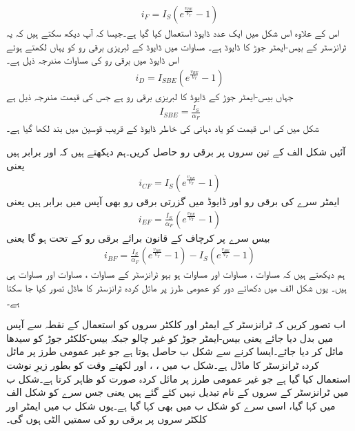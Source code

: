 \begin{align}
i_F = I_S \left (e^{\frac{v_{BE}}{V_T}}-1 \right )
\end{align}
اس کے علاوہ اس شکل میں ایک عدد ڈایوڈ استعمال کیا گیا ہے۔جیسا کہ آپ دیکھ سکتے ہیں کہ یہ ٹرانزسٹر کے بیس-ایمٹر  جوڑ کا ڈایوڈ   ہے۔ مساوات  میں ڈایوڈ کے لبریزی برقی رو کو یہاں لکھتے ہوئے اس ڈایوڈ میں برقی رو کی مساوات مندرجہ ذیل ہے۔
\begin{align}
i_D=I_{SBE} \left (e^{\frac{v_{BE}}{V_T}}-1 \right )
\end{align}
جہاں   بیس-ایمٹر  جوڑ کے ڈایوڈ کا لبریزی برقی رو ہے جس کی قیمت مندرجہ ذیل ہے
\begin{align}
I_{SBE}=\frac{I_S}{\alpha_F}
\end{align}
شکل میں  کی اس قیمت کو یاد دہانی کی خاطر ڈایوڈ کے قریب قوسین میں بند لکھا گیا ہے۔

آئیں شکل  الف کے تین سروں پر برقی رو حاصل کریں۔ہم دیکھتے ہیں کہ  اور  برابر ہیں یعنی
\begin{align} \label{مساوات_ٹرانزسٹر_ہوبہو_کلکٹر _سیدھی_رو}
i_{CF}=I_S \left (e^{\frac{v_{BE}}{V_T}}-1 \right )
\end{align}
ایمٹر سرے کی برقی رو  اور ڈایوڈ    میں گزرتی برقی رو   بھی آپس میں برابر ہیں یعنی
\begin{align} \label{مساوات_ٹرانزسٹر_ہوبہو_مخارج_سیدھی_رو}
i_{EF}=\frac{I_S}{\alpha_F} \left (e^{\frac{v_{BE}}{V_T}}-1 \right )
\end{align}
بیس سرے پر کرچاف کے قانون برائے برقی رو کے تحت   ہو گا یعنی
\begin{align} \label{مساوات_ٹرانزسٹر_ہوبہو_قابو_سیدھی_رو_الف}
i_{BF}=\frac{I_S}{\alpha_F} \left (e^{\frac{v_{BE}}{V_T}}-1 \right )-I_S \left (e^{\frac{v_{BE}}{V_T}}-1 \right )
\end{align}
ہم دیکھتے ہیں کہ مساوات  ، مساوات   اور مساوات   ہو بہو ٹرانزسٹر کے مساوات  ، مساوات   اور مساوات   ہی ہیں۔ یوں شکل  الف میں دکھائے دور کو عمومی طرز پر مائل کردہ ٹرانزسٹر کا ماڈل تصور کیا جا سکتا ہے۔

اب تصور کریں کہ ٹرانزسٹر کے ایمٹر اور کلکٹر  سروں کو استعمال کے نقطہ سے آپس میں بدل دیا جائے یعنی بیس-ایمٹر  جوڑ کو غیر چالو جبکہ بیس-کلکٹر جوڑ کو سیدھا مائل کر دیا جائے۔ایسا کرنے سے شکل  ب حاصل ہوتا ہے جو غیر عمومی طرز پر مائل کردہ ٹرانزسٹر کا ماڈل ہے۔شکل  ب میں   ، ، اور  لکھتے وقت   کو بطور  زیرِ نوشت استعمال کیا گیا ہے جو غیر عمومی طرز پر مائل کردہ صورت کو ظاہر کرتا ہے۔شکل  ب میں ٹرانزسٹر کے سروں کے نام تبدیل نہیں کئے گئے ہیں یعنی جس سرے کو شکل  الف   میں  کہا گیا، اسی سرے کو شکل  ب میں بھی  کہا گیا ہے۔یوں شکل  ب میں ایمٹر اور کلکٹر  سروں پر برقی رو کی سمتیں الٹی ہوں گی۔

